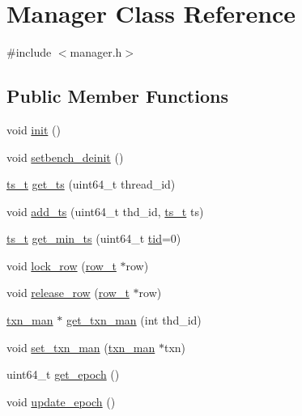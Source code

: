 \hypertarget{classManager}{}\section{Manager Class Reference}
\label{classManager}


{\ttfamily \#include $<$manager.\+h$>$}

\subsection*{Public Member Functions}
\begin{DoxyCompactItemize}
\item 
void \hyperlink{classManager_a5e70b531d3af13c1a6af84dcc84fa225}{init} ()
\item 
void \hyperlink{classManager_a74880d5dc83646708152b9b36430cac0}{setbench\+\_\+deinit} ()
\item 
\hyperlink{global_8h_aaf095dfc9b10f757c968fe146ad7e724}{ts\+\_\+t} \hyperlink{classManager_a61c4d259fc2e68dd0f0687956b873f06}{get\+\_\+ts} (uint64\+\_\+t thread\+\_\+id)
\item 
void \hyperlink{classManager_a38f950d2922952fe93425db9e627a873}{add\+\_\+ts} (uint64\+\_\+t thd\+\_\+id, \hyperlink{global_8h_aaf095dfc9b10f757c968fe146ad7e724}{ts\+\_\+t} ts)
\item 
\hyperlink{global_8h_aaf095dfc9b10f757c968fe146ad7e724}{ts\+\_\+t} \hyperlink{classManager_a7a4b0edad70dc91abe7ddcc49fc7ed77}{get\+\_\+min\+\_\+ts} (uint64\+\_\+t \hyperlink{microbench_2main_8cpp_a9ca9869868fe7e7a38a921cc7de4103f}{tid}=0)
\item 
void \hyperlink{classManager_a3e78aa1d124adce621968849bf780525}{lock\+\_\+row} (\hyperlink{classrow__t}{row\+\_\+t} $\ast$row)
\item 
void \hyperlink{classManager_abe51a30570ddb5180653c0a7fdaeb5b5}{release\+\_\+row} (\hyperlink{classrow__t}{row\+\_\+t} $\ast$row)
\item 
\hyperlink{classtxn__man}{txn\+\_\+man} $\ast$ \hyperlink{classManager_acf3a85553d0879190c6a8293bf475e8f}{get\+\_\+txn\+\_\+man} (int thd\+\_\+id)
\item 
void \hyperlink{classManager_a0a3992cf0f8cb6e267df5d9511ef0265}{set\+\_\+txn\+\_\+man} (\hyperlink{classtxn__man}{txn\+\_\+man} $\ast$txn)
\item 
uint64\+\_\+t \hyperlink{classManager_a397c36cac2730af19ba1835b7886661a}{get\+\_\+epoch} ()
\item 
void \hyperlink{classManager_a107fabeaae1ae04fb8223475fd678344}{update\+\_\+epoch} ()
\end{DoxyCompactItemize}


